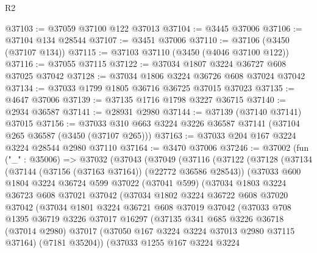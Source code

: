 \begin{lexlean}{R2}
\begin{coremodule}
@37103 := @37059 @37100 @122 @37013
@37104 := @3445 @37006
@37106 := @37104 @134 @28544
@37107 := @3451 @37006
@37110 := @37106 (@3450 (@37107 @134))
@37115 := @37103 @37110 (@3450 (@4046 @37100 @122))
@37116 := @37055 @37115
@37122 := @37034 @1807 @3224 @36727 @608 @37025 @37042
@37128 := @37034 @1806 @3224 @36726 @608 @37024 @37042
@37134 := @37033 @1799 @1805 @36716 @36725 @37015 @37023
@37135 := @4647 @37006
@37139 := @37135 @1716 @1798 @3227 @36715
@37140 := @2934 @36587
@37141 := @28931 @2980
@37144 := @37139 (@37140 @37141) @37015
@37156 := @37033 @310 @663 @3224 @3226 @36587 @37141 (@37104 @265 @36587 (@3450 (@37107 @265)))
@37163 := @37033 @204 @167 @3224 @3224 @28544 @2980 @37110
@37164 := @3470 @37006
@37246 := @37002
    (fun ("_" : @35006) =>
    @37032
      (@37043
        (@37049
          (@37116
            (@37122
              (@37128
                (@37134
                  (@37144 (@37156 (@37163 @37164)) (@22772 @36586 @28543))
                  (@37033
                    @600
                    @1804
                    @3224
                    @36724
                    @599
                    @37022
                    (@37041 @599)
                    (@37034
                      @1803
                      @3224
                      @36723
                      @608
                      @37021
                      @37042
                      (@37034
                        @1802
                        @3224
                        @36722
                        @608
                        @37020
                        @37042
                        (@37034
                          @1801
                          @3224
                          @36721
                          @608
                          @37019
                          @37042
                          (@37033
                            @708
                            @1395
                            @36719
                            @3226
                            @37017
                            @16297
                            (@37135
                              @341
                              @685
                              @3226
                              @36718
                              (@37014 @2980)
                              @37017
                              (@37050 @167 @3224 @3224 @37013 @2980 @37115 @37164)
                              (@7181 @35204))
                            (@37033
                              @1255
                              @167
                              @3224
                              @3224

\end{coremodule}
\end{lexlean}
